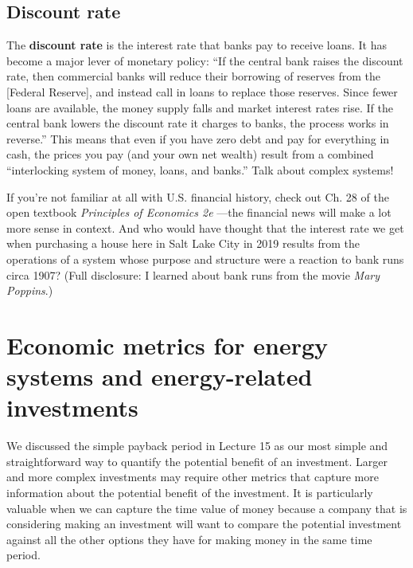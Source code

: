 \documentclass[10pt]{article}
\begin{document}
\subsection{Discount rate}

The \textbf{discount rate} is the interest rate that banks pay to receive loans. It has become a major lever of monetary policy: ``If the central bank raises the discount rate, then commercial banks will reduce their borrowing of reserves from the [Federal Reserve], and instead call in loans to replace those reserves. Since fewer loans are available, the money supply falls and market interest rates rise. If the central bank lowers the discount rate it charges to banks, the process works in reverse.'' \cite{Greenlaw_undated-ok} This means that even if you have zero debt and pay for everything in cash, the prices you pay (and your own net wealth) result from a combined ``interlocking system of money, loans, and banks.'' \cite{Greenlaw_undated-ok} Talk about complex systems!

If you're not familiar at all with U.S. financial history, check out Ch. 28 of the open textbook \textit{Principles of Economics 2e} \cite{Greenlaw_undated-ok} ---the financial news will make a lot more sense in context. And who would have thought that the interest rate we get when purchasing a house here in Salt Lake City in 2019 results from the operations of a system whose purpose and structure were a reaction to bank runs circa 1907? (Full disclosure: I learned about bank runs from the movie \textit{Mary Poppins}.) 



\section{Economic metrics for energy systems and energy-related investments}
\label{em}

   {}
\smallskip

We discussed the simple payback period in Lecture 15 as our most simple and straightforward way to quantify the potential benefit of an investment. Larger and more complex investments may require other metrics that capture more information about the potential benefit of the investment. It is particularly valuable when we can capture the time value of money because a company that is considering making an investment will want to compare the potential investment against all the other options they have for making money in the same time period. 
\end{document}
